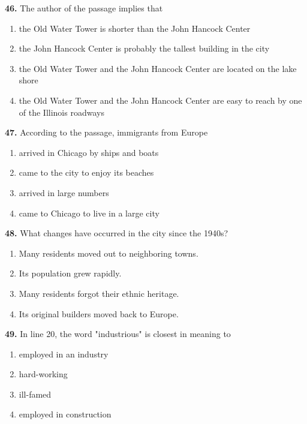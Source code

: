 \documentclass[12pt]{article}
\begin{document}
\vspace{0.25\baselineskip}
\noindent\textbf{46.} The author of the passage implies that
\begin{enumerate}[label=(\Alph*),leftmargin=*,itemsep=0.2em]
\item the Old Water Tower is shorter than the John Hancock Center
\item the John Hancock Center is probably the tallest building in the city
\item the Old Water Tower and the John Hancock Center are located on the lake shore
\item the Old Water Tower and the John Hancock Center are easy to reach by one of the Illinois roadways
\end{enumerate}
\par
\vspace{0.25\baselineskip}
\noindent\textbf{47.} According to the passage, immigrants from Europe
\begin{enumerate}[label=(\Alph*),leftmargin=*,itemsep=0.2em]
\item arrived in Chicago by ships and boats
\item came to the city to enjoy its beaches
\item arrived in large numbers
\item came to Chicago to live in a large city
\end{enumerate}
\par
\vspace{0.25\baselineskip}
\noindent\textbf{48.} What changes have occurred in the city since the 1940s?
\begin{enumerate}[label=(\Alph*),leftmargin=*,itemsep=0.2em]
\item Many residents moved out to neighboring towns.
\item Its population grew rapidly.
\item Many residents forgot their ethnic heritage.
\item Its original builders moved back to Europe.
\end{enumerate}
\par
\vspace{0.25\baselineskip}
\noindent\textbf{49.} In line 20, the word "industrious" is closest in meaning to
\begin{enumerate}[label=(\Alph*),leftmargin=*,itemsep=0.2em]
\item employed in an industry
\item hard-working
\item ill-famed
\item employed in construction
\end{enumerate}
\end{document}
